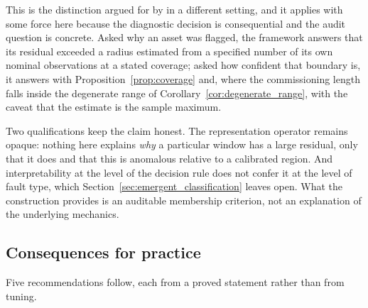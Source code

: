 \documentclass[a4paper]{cas-sc}
\begin{document}
This is the distinction argued for by \citet{rudin2019} in a different
setting, and it applies with some force here because the diagnostic decision
is consequential and the audit question is concrete. Asked why an asset was
flagged, the framework answers that its residual exceeded a radius estimated
from a specified number of its own nominal observations at a stated coverage;
asked how confident that boundary is, it answers with
Proposition~\ref{prop:coverage} and, where the commissioning length falls
inside the degenerate range of
Corollary~\ref{cor:degenerate_range}, with the caveat that the estimate is the
sample maximum.

Two qualifications keep the claim honest. The representation operator remains
opaque: nothing here explains \emph{why} a particular window has a large
residual, only that it does and that this is anomalous relative to a
calibrated region. And interpretability at the level of the decision rule does
not confer it at the level of fault type, which
Section~\ref{sec:emergent_classification} leaves open. What the construction
provides is an auditable membership criterion, not an explanation of the
underlying mechanics.

\subsection{Consequences for practice}
\label{subsec:disc_practice}

Five recommendations follow, each from a proved statement rather than from
tuning.
\end{document}
